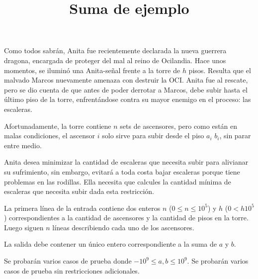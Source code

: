 \documentclass{oci}
\title{Suma de ejemplo}
\begin{document}
\begin{problemDescription}
  Como todos sabrán, Anita fue recientemente
  declarada la nueva guerrera dragona, encargada
  de proteger del mal al reino de Ocilandia.
  Hace unos momentos, se iluminó una Anita-señal
  frente a la torre de $h$ pisos.
  Resulta que el malvado Marcos nuevamente amenaza
  con destruir la OCI.
  Anita fue al rescate, pero se dio cuenta de que
  antes de poder derrotar a Marcos, debe subir
  hasta el último piso de la torre, enfrentándose
  contra su mayor enemigo en el proceso: las escaleras.

  Afortunadamente, la torre contiene $n$ sets de ascensores,
  pero como están en malas condiciones, el ascensor $i$
  solo sirve para subir desde el piso $a_i$
  $b_i$, sin parar entre medio.

  Anita desea minimizar la cantidad de escaleras que
  necesita subir para alivianar su sufrimiento, sin embargo,
  evitará a toda costa bajar escaleras porque tiene
  problemas en las rodillas.
  Ella necesita que calcules la cantidad mínima de escaleras
  que necesita subir dada esta restricción.
\end{problemDescription}

\begin{inputDescription}
  La primera línea de la entrada contiene dos enteros
  $n$ ($0 \leq n \leq 10^5$) y $h$ ($0< h 10^5$)
  correspondientes a la cantidad de ascensores y la cantidad
  de pisos en la torre.
  Luego siguen $n$ líneas describiendo cada uno de los ascensores.
\end{inputDescription}

\begin{outputDescription}
  La salida debe contener un único entero correspondiente a la suma de $a$ y $b$.
\end{outputDescription}

\begin{scoreDescription}
   Se probarán varios casos de prueba donde $-10^9\leq a, b \leq 10^9$.
   Se probarán varios casos de prueba sin restricciones adicionales.
\end{scoreDescription}

\begin{sampleDescription}
\end{sampleDescription}
\end{document}

